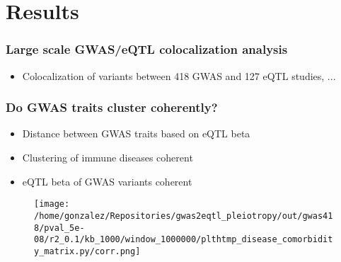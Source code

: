 \documentclass{beamer}
\begin{document}
\section{Results}

\begin{frame}
\frametitle{Large scale GWAS/eQTL colocalization analysis}

\begin{itemize}
\item Colocalization of variants between 418 GWAS and 127 eQTL studies, ...
\end{itemize}


\end{frame}

\begin{frame}
\frametitle{Do GWAS traits cluster coherently?}

\begin{itemize}
\item Distance between GWAS traits based on eQTL beta
\item Clustering of immune diseases coherent
\item eQTL beta of GWAS variants coherent
\end{itemize}

\begin{figure}[!]
\texttt{[image: /home/gonzalez/Repositories/gwas2eqtl\_pleiotropy/out/gwas418/pval\_5e-08/r2\_0.1/kb\_1000/window\_1000000/plthtmp\_disease\_comorbidity\_matrix.py/corr.png]}
\end{figure}

\end{frame}


\end{document}
